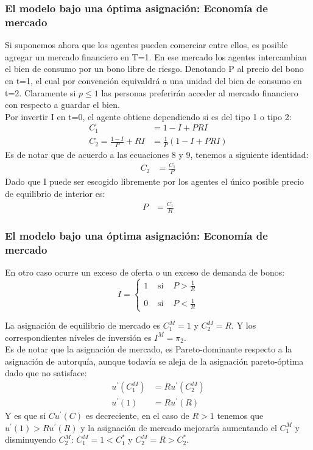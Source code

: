 \documentclass[10pt, xcolor=table, x11names]{beamer}
\begin{document}
\begin{frame}
    \frametitle{{\normalsize El modelo bajo una óptima asignación: Economía de mercado } {}}
    Si suponemos ahora que los agentes pueden comerciar entre ellos, es posible agregar un mercado financiero en T=1. En ese mercado los agentes intercambian el bien de consumo por un bono libre de riesgo. Denotando P al precio del bono en t=1, el cual por convención equivaldrá a una unidad del bien de consumo en t=2. Claramente si $p\leq1 $ las personas preferirán acceder al mercado financiero con respecto a guardar el bien.\\
    Por invertir I en t=0, el agente obtiene dependiendo si es del tipo 1 o tipo 2:
      \begin{align}
      C_{1}&=1-I+PRI\\
      C_{2}=\frac{1-I}{P}+RI&=\frac{1}{P}\left( 1-I+PRI\right) 
      \end{align}
    Es de notar que de acuerdo a las ecuaciones 8 y 9, tenemos a siguiente identidad:
     \begin{align}
     C_{2}&=\frac{C_{1}}{P}
    \end{align}
    Dado que I puede ser escogido libremente por los agentes el único  posible precio de equilibrio de interior es:
     \begin{align}
     P&=\frac{C_{1}}{R}
     \end{align}
 \end{frame}


\begin{frame}
    \frametitle{{\normalsize El modelo bajo una óptima asignación: Economía de mercado } {}}
    En otro caso ocurre un exceso de oferta o un exceso de demanda de bonos:
     \[
    I= \left\{ \begin{array}{lcl}
    1 & \mbox{ si } & P>\frac{1}{R} \\
    & & \\
    0 & \mbox{ si } & P<\frac{1}{R}
    \end{array}
    \right.
    \]
    
    La asignación de equilibrio de mercado es $C_{1}^{M}=1$ y $C_{2}^{M}=R$. Y los correspondientes niveles de inversión es $ I^{M}=\pi_{2}$.\\
    Es de notar que la asignación de mercado, es Pareto-dominante respecto a la asignación de autorquía, aunque todavía se aleja de la asignación pareto-óptima dado que no satisface:
    \begin{align}
    u^{'}(C_{1}^{M})&=Ru^{'}(C_{2}^{M})\nonumber \\
    u^{'}(1)&=Ru^{'}(R)\nonumber
    \end{align}
    Y es que si $Cu^{'}(C)$ es decreciente, en el caso de $R>1$ tenemos que $u^{'}(1)>Ru^{'}(R)$ y la asignación de mercado mejoraría aumentando el $C_{1}^{M}$ y disminuyendo $C_{2}^{M}$: $C_{1}^{M}=1<C_{1}^{*} $ y $C_{2}^{M}=R>C_{2}^{*} $.
    \end{frame}
\end{document}
